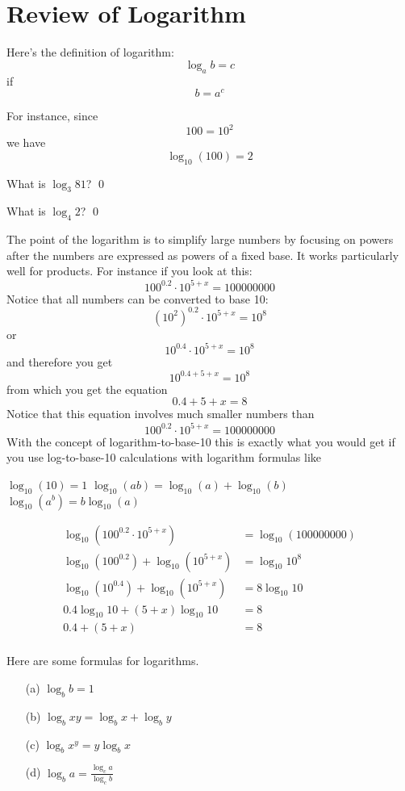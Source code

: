 \section{Review of Logarithm}

Here's the definition of logarithm:
\[
\log_a b = c
\]
if
\[
b = a^c
\]

For instance, since
\[
100 = 10^2
\]
we have
\[
\log_{10} (100) = 2
\]

\begin{ex}
What is $\log_{3} 81$?
\qed
\end{ex}

\begin{ex}
What is $\log_{4} 2$?
\qed
\end{ex}

The point of the logarithm is to simplify large numbers by focusing on powers
after the numbers are expressed as powers of a fixed base.
It works particularly well for products.
For instance if you look at this:
\[
100^{0.2} \cdot 10^{5 + x} = 100000000
\]
Notice that all numbers can be converted to base 10:
\[
(10^2)^{0.2} \cdot 10^{5 + x} = 10^8
\]
or
\[
10^{0.4} \cdot 10^{5 + x} = 10^8
\]
and therefore you get
\[
10^{0.4 + 5 + x} = 10^8
\]
from which you get the equation
\[
0.4 + 5 + x = 8
\]
Notice that this equation involves much smaller numbers than
\[
100^{0.2} \cdot 10^{5 + x} = 100000000
\]
With the concept of logarithm-to-base-10 this is exactly what you would get
if you use log-to-base-10 calculations with logarithm formulas like
\begin{itemize}
\li $\log_{10} (10) = 1$
\li $\log_{10}(ab) = \log_{10}(a) + \log_{10}(b)$
\li $\log_{10} (a^b) = b \log_{10}(a)$
\end{itemize}
\begin{align*}
\log_{10} (100^{0.2} \cdot 10^{5 + x}) &= \log_{10}(100000000) \\
\log_{10} (100^{0.2}) + \log_{10} (10^{5 + x}) &= \log_{10} 10^8 \\
\log_{10} (10^{0.4}) + \log_{10} (10^{5 + x}) &= 8 \log_{10} 10 \\
0.4 \log_{10} 10 + (5 + x)\log_{10} 10 &= 8 \\
0.4  + (5 + x) &= 8  \\
\end{align*}


\begin{prop} Here are some formulas for logarithms.
\begin{itemize}
\item[\textnormal{(a)}] $\log_b b = 1$
\item[\textnormal{(b)}] $\log_b xy = \log_b x + \log_b y$
\item[\textnormal{(c)}] $\log_b x^y = y \log_b x$
\item[\textnormal{(d)}] $\log_b a = \frac{\log_c a}{\log_c b}$
\end{itemize}
\end{prop}



